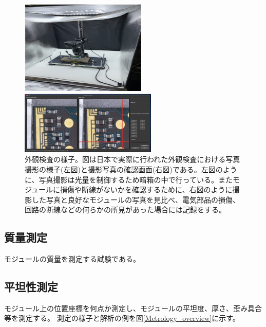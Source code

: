 \begin{figure}[bpt]\centering
  \begin{minipage}{0.4\hsize}
    \begin{center}
    \includegraphics[width=60mm]{./VI_setup.png}
    \end{center}
  \end{minipage}
  \begin{minipage}{0.4\hsize}
    \begin{center}
    \includegraphics[width=65mm]{./VI_analysis.png}
    \end{center}
  \end{minipage}
  \caption[外観検査の様子]{外観検査の様子。図は日本で実際に行われた外観検査における写真撮影の様子(左図)と撮影写真の確認画面(右図)である。左図のように、写真撮影は光量を制御するため暗箱の中で行っている。またモジュールに損傷や断線がないかを確認するために、右図のように撮影した写真と良好なモジュールの写真を見比べ、電気部品の損傷、回路の断線などの何らかの所見があった場合には記録をする。}
  \label{VI_overview}
\end{figure}

\subsection{質量測定}
モジュールの質量を測定する試験である。

\subsection{平坦性測定}
モジュール上の位置座標を何点か測定し、モジュールの平坦度、厚さ、歪み具合等を測定する。
測定の様子と解析の例を図\ref{Metrology_overview}に示す。

